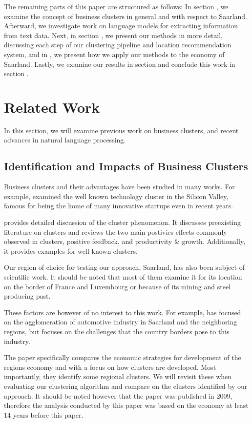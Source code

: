 \documentclass[conference]{IEEEtran}
\begin{document}
The remaining parts of this paper are structured as follows: In section \MakeUppercase{}, we examine the concept of business clusters in general and with respect to Saarland. Afterward, we investigate work on language models for extracting information from text data. Next, in section \MakeUppercase{}, we present our methods in more detail, discussing each step of our clustering pipeline and location recommendation system, and in \MakeUppercase{}, we present how we apply our methods to the economy of Saarland. Lastly, we examine our results in section \MakeUppercase{} and conclude this work in section \MakeUppercase{}.

\section{Related Work}
In this section, we will examine previous work on business clusters, and recent advances in natural language processing.

\subsection{Identification and Impacts of Business Clusters}

Business clusters and their advantages have been studied in many works. For example, \cite{regionaladv} examined the well known technology cluster in the Silicon Valley, famous for being the home of many innovative startups even in recent years. 

\cite{clustertheory} provides detailed discussion of the cluster phenomenon. It discusses preexisting literature on clusters and reviews the two main postivies effects commonly observed in clusters, positive feedback, and productivity \& growth. Additionally, it provides examples for well-known clusters.

Our region of choice for testing our approach, Saarland, has also been subject of scientific work. It should be noted that most of them examine it for its location on the border of France and Luxembourg or because of its mining and steel producing past.

These factors are however of no interest to this work. For example, \cite{saarlandeco1} has focused on the agglomeration of automotive industry in Saarland and the neighboring regions, but focuses on the challenges that the country borders pose to this industry.

The paper \cite{saarlandeco2} specifically compares the economic strategies for development of the regions economy and with a focus on how clusters are developed. Most importantly, they identify some regional clusters. We will revisit these when evaluating our clustering algorithm and compare on the clusters identified by our approach. It should be noted however that the paper was published in 2009, therefore the analysis conducted by this paper was based on the economy at least 14 years before this paper.
\end{document}
